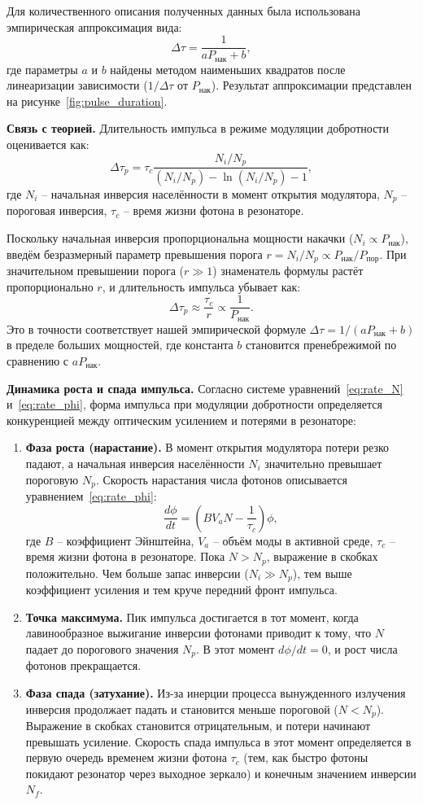 \documentclass[12pt, a4paper]{article}
\begin{document}
Для количественного описания полученных данных была использована эмпирическая аппроксимация вида:
\[
\Delta\tau = \frac{1}{a P_{\text{нак}} + b},
\]
где параметры $a$ и $b$ найдены методом наименьших квадратов после линеаризации зависимости ($1/\Delta\tau$ от $P_{\text{нак}}$). Результат аппроксимации представлен на рисунке~\ref{fig:pulse_duration}.

\textbf{Связь с теорией.} Длительность импульса в режиме модуляции добротности оценивается как:
\[
\Delta\tau_p = \tau_c \frac{N_i/N_p}{(N_i/N_p) - \ln(N_i/N_p) - 1},
\]
где $N_i$ -- начальная инверсия населённости в момент открытия модулятора, $N_p$ -- пороговая инверсия, $\tau_c$ -- время жизни фотона в резонаторе.

Поскольку начальная инверсия пропорциональна мощности накачки ($N_i \propto P_{\text{нак}}$), введём безразмерный параметр превышения порога $r = N_i/N_p \propto P_{\text{нак}}/P_{\text{пор}}$. При значительном превышении порога ($r \gg 1$) знаменатель формулы растёт пропорционально $r$, и длительность импульса убывает как:
\[
\Delta\tau_p \approx \frac{\tau_c}{r} \propto \frac{1}{P_{\text{нак}}}.
\]
Это в точности соответствует нашей эмпирической формуле $\Delta\tau = 1/(a P_{\text{нак}} + b)$ в пределе больших мощностей, где константа $b$ становится пренебрежимой по сравнению с $a P_{\text{нак}}$.

\textbf{Динамика роста и спада импульса.} 
Согласно системе уравнений~\eqref{eq:rate_N} и~\eqref{eq:rate_phi}, форма импульса при модуляции добротности определяется конкуренцией между оптическим усилением и потерями в резонаторе:
\begin{enumerate}
    \item \textbf{Фаза роста (нарастание).} В момент открытия модулятора потери резко падают, а начальная инверсия населённости $N_i$ значительно превышает пороговую $N_p$. Скорость нарастания числа фотонов описывается уравнением~\eqref{eq:rate_phi}:
    \[
    \frac{d\phi}{dt} = \left( B V_a N - \frac{1}{\tau_c} \right) \phi,
    \]
    где $B$ -- коэффициент Эйнштейна, $V_a$ -- объём моды в активной среде, $\tau_c$ -- время жизни фотона в резонаторе. Пока $N > N_p$, выражение в скобках положительно. Чем больше запас инверсии ($N_i \gg N_p$), тем выше коэффициент усиления и тем круче передний фронт импульса.
    
    \item \textbf{Точка максимума.} Пик импульса достигается в тот момент, когда лавинообразное выжигание инверсии фотонами приводит к тому, что $N$ падает до порогового значения $N_p$. В этот момент $d\phi/dt = 0$, и рост числа фотонов прекращается.
    
    \item \textbf{Фаза спада (затухание).} Из-за инерции процесса вынужденного излучения инверсия продолжает падать и становится меньше пороговой ($N < N_p$). Выражение в скобках становится отрицательным, и потери начинают превышать усиление. Скорость спада импульса в этот момент определяется в первую очередь временем жизни фотона $\tau_c$ (тем, как быстро фотоны покидают резонатор через выходное зеркало) и конечным значением инверсии $N_f$.
\end{enumerate}
\end{document}
